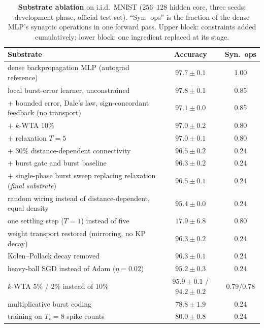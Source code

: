 \documentclass{article}
\newcommand{\kwta}{$k$-WTA}
\begin{document}
\begin{table}[t]
\centering
\caption{\textbf{Substrate ablation} on i.i.d.\ MNIST ($256$--$128$ hidden core, three seeds;
development phase, official test set).
``Syn.\ ops'' is the fraction of the dense MLP's synaptic operations in one forward pass.
Upper block: constraints added cumulatively; lower block: one ingredient replaced at its stage.}
\label{tab:substrate}
\small
\begin{tabular}{@{}lcc@{}}
\toprule
Substrate & Accuracy & Syn.\ ops \\
\midrule
dense backpropagation MLP (autograd reference) & $97.7\pm0.1$ & 1.00 \\
local burst-error learner, unconstrained & $97.8\pm0.1$ & 0.85 \\
$+$ bounded error, Dale's law, sign-concordant feedback (no transport) & $97.1\pm0.0$ & 0.85 \\
$+$ \kwta{} $10\%$ & $97.0\pm0.2$ & 0.80 \\
$+$ relaxation $T{=}5$ & $97.0\pm0.1$ & 0.80 \\
$+$ $30\%$ distance-dependent connectivity & $96.5\pm0.2$ & 0.24 \\
$+$ burst gate and burst baseline & $96.3\pm0.2$ & 0.24 \\
$+$ single-phase burst sweep replacing relaxation (\emph{final substrate}) & $96.5\pm0.1$ & 0.24 \\
\midrule
random wiring instead of distance-dependent, equal density & $95.4\pm0.0$ & 0.24 \\
one settling step ($T{=}1$) instead of five & $17.9\pm6.8$ & 0.80 \\
weight transport restored (mirroring, no KP decay) & $96.3\pm0.2$ & 0.24 \\
Kolen--Pollack decay removed & $96.3\pm0.1$ & 0.24 \\
heavy-ball SGD instead of Adam ($\eta=0.02$) & $95.2\pm0.3$ & 0.24 \\
\kwta{} $5\%$ / $2\%$ instead of $10\%$ & $95.9\pm0.1$ / $94.2\pm0.2$ & 0.79/0.78 \\
multiplicative burst coding & $78.8\pm1.9$ & 0.24 \\
training on $T_s{=}8$ spike counts & $80.0\pm0.8$ & 0.24 \\
\bottomrule
\end{tabular}
\end{table}
\end{document}
